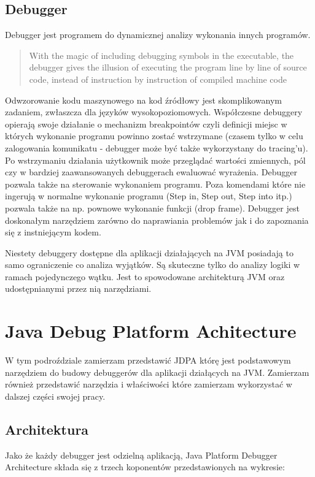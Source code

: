\subsection{Debugger}
Debugger jest programem do dynamicznej analizy wykonania innych programów. 
\begin{quote}
    With the magic of including debugging symbols in the executable, the debugger gives the illusion of executing the program line by line of source code, instead of instruction by instruction of compiled machine code~\cite{artOfDebugging}
\end{quote}
Odwzorowanie kodu maszynowego na kod źródłowy jest skomplikowanym zadaniem, zwłaszcza dla języków wysokopoziomowych. Współczesne debuggery opierają swoje działanie o mechanizm breakpointów czyli definicji miejsc w których wykonanie programu powinno zostać wstrzymane (czasem tylko w celu zalogowania komunikatu - debugger może być także wykorzystany do tracing'u). Po wstrzymaniu działania użytkownik może przeglądać wartości zmiennych, pól czy w bardziej zaawansowanych debuggerach ewaluować wyrażenia.
Debugger pozwala także na sterowanie wykonaniem programu. Poza komendami które nie ingerują w normalne wykonanie programu (Step in, Step out, Step into itp.) pozwala także na np. pownowe wykonanie funkcji (drop frame). Debugger jest doskonałym narzędziem zarówno do naprawiania problemów jak i do zapoznania się z instniejącym kodem.



Niestety debuggery dostępne dla aplikacji działających na JVM posiadają to samo ograniczenie co   analiza wyjątków. Są skuteczne tylko do analizy logiki w ramach pojedynczego wątku. Jest to spowodowane architekturą JVM oraz udostępnianymi przez nią narzędziami.


\section{Java Debug Platform Achitecture}

W tym podroździale zamierzam przedstawić JDPA którę jest podstawowym narzędziem do budowy debuggerów dla aplikacji działących na JVM. Zamierzam również przedstawić narzędzia i właściwości które zamierzam wykorzystać w dalszej części swojej pracy.

\subsection{Architektura}

Jako że każdy debugger jest odzielną aplikacją, Java Platform Debugger Architecture składa się z trzech koponentów przedstawionych na wykresie:


